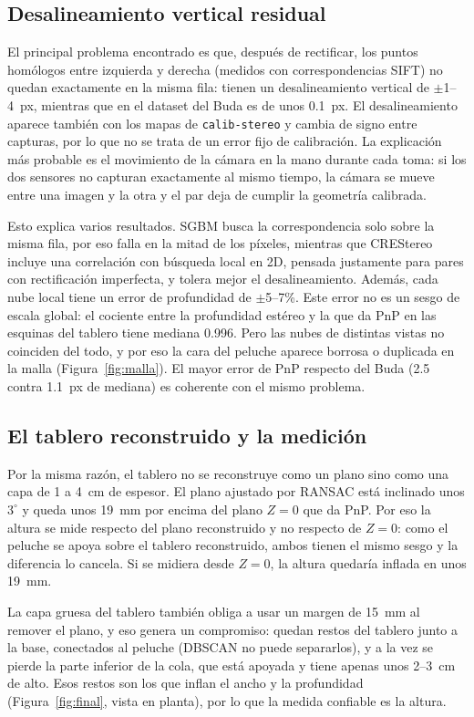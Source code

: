 \documentclass[conference]{IEEEtran}
\begin{document}
\subsection{Desalineamiento vertical residual}

El principal problema encontrado es que, después de rectificar, los puntos
homólogos entre izquierda y derecha (medidos con correspondencias SIFT) no
quedan exactamente en la misma fila: tienen un desalineamiento vertical de
$\pm$1--4~px, mientras que en el dataset del Buda es de unos 0.1~px. El
desalineamiento aparece también con los mapas de \texttt{calib-stereo} y
cambia de signo entre capturas, por lo que no se trata de un error fijo de
calibración. La explicación más probable es el movimiento de la cámara en la
mano durante cada toma: si los dos sensores no capturan exactamente al mismo
tiempo, la cámara se mueve entre una imagen y la otra y el par deja de
cumplir la geometría calibrada.

Esto explica varios resultados. SGBM busca la correspondencia solo sobre la
misma fila, por eso falla en la mitad de los píxeles, mientras que CREStereo
incluye una correlación con búsqueda local en 2D, pensada justamente para
pares con rectificación imperfecta, y tolera mejor el desalineamiento.
Además, cada nube local tiene un error de profundidad de $\pm$5--7\%. Este
error no es un sesgo de escala global: el cociente entre la profundidad
estéreo y la que da PnP en las esquinas del tablero tiene mediana 0.996.
Pero las nubes de distintas vistas no coinciden del todo, y por eso la cara
del peluche aparece borrosa o duplicada en la malla
(Figura~\ref{fig:malla}). El mayor error de PnP respecto del Buda (2.5 contra
1.1~px de mediana) es coherente con el mismo problema.

\subsection{El tablero reconstruido y la medición}

Por la misma razón, el tablero no se reconstruye como un plano sino como una
capa de 1 a 4~cm de espesor. El plano ajustado por RANSAC está inclinado
unos $3^\circ$ y queda unos 19~mm por encima del plano $Z=0$ que da PnP. Por
eso la altura se mide respecto del plano reconstruido y no respecto de
$Z=0$: como el peluche se apoya sobre el tablero reconstruido, ambos tienen el
mismo sesgo y la diferencia lo cancela. Si se midiera desde $Z=0$, la altura
quedaría inflada en unos 19~mm.

La capa gruesa del tablero también obliga a usar un margen de 15~mm al
remover el plano, y eso genera un compromiso: quedan restos del tablero junto
a la base, conectados al peluche (DBSCAN no puede separarlos), y a la vez se
pierde la parte inferior de la cola, que está apoyada y tiene apenas unos
2--3~cm de alto. Esos restos son los que inflan el ancho y la profundidad
(Figura~\ref{fig:final}, vista en planta), por lo que la medida confiable es
la altura.
\end{document}
